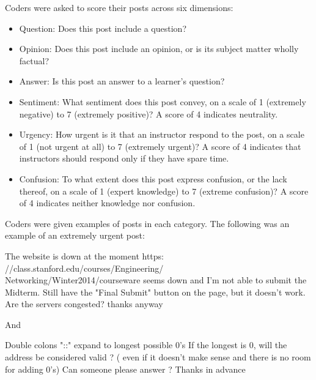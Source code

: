 \documentclass{edm_template}
\begin{document}
Coders were asked to score their posts across six dimensions:
\begin{itemize}
\vspace{-15pt}
       \setlength\itemsep{0.05em}
       \item Question: Does this post include a question?
       \item Opinion: Does this post include an opinion, or is its subject matter wholly factual?
       \item Answer: Is this post an answer to a learner's question?
       \item Sentiment: What sentiment does this post convey, on a scale of 1 (extremely negative) to 7 (extremely positive)? A score of 4 indicates neutrality.
       \item Urgency: How urgent is it that an instructor respond to the post, on a scale of 1 (not urgent at all) to 7 (extremely urgent)? A score of 4 indicates that instructors should respond only if they have spare time.
       \item Confusion: To what extent does this post express confusion, or the lack thereof, on a scale of 1 (expert knowledge) to 7 (extreme confusion)? A score of 4 indicates neither knowledge nor confusion.
\end{itemize}
\vspace{-15pt}
Coders were given examples of posts in each category. The following was an example of an extremely urgent post:

\vspace{-14pt}
\begin{displayquote}
The website is down at the moment
       https:\\//class.stanford.edu/courses/Engineering/\\Networking/Winter2014/courseware
       seems down and I'm not able to submit the Midterm. Still have
       the "Final Submit" button on the page, but it doesn't work. Are
       the servers congested? 
       thanks anyway
\end{displayquote}
\vspace{-14pt}

And

\vspace{-14pt}
\begin{displayquote}
Double colons "::"  expand to longest possible 0's  
       If the longest is 0, will  the address be considered valid ?  (
       even if it doesn't make sense and there is no room for adding
       0's) 
       Can someone please answer ?
       Thanks in advance
\end{displayquote}
\vspace{-14pt}
\end{document}
